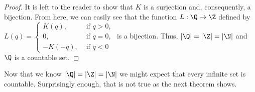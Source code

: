 \begin{proof}
\begin{comment}
Now we need to show $K$ is a surjection. Let $c \in \Z^+$. If $c=1$, then $K\left( \frac{1}{1} \right) = c$. If $c > 1$, then $c$ has prime power factorization $r_1^{2\gamma_1} r_2^{2\gamma_2} \cdots r_l^{2\gamma_l}$ for distinct primes $r_1, r_2, \ldots r_l$, and positive integers $\gamma_1, \gamma_2, \ldots, \gamma_l$. Rearrange the primes $r_i$ so that $\gamma_1, \gamma_2, \ldots, \gamma_k$ are even and $\gamma_{k+1}, \gamma_{k+2}, \ldots, \gamma_{l}$ are odd. Define $p_1, p_2, \ldots, p_k$, $q_1, q_2, \ldots, q_m$, $\alpha_1, \alpha_2, \ldots, \alpha_k$, and $\beta_1, \beta_2, \ldots, \beta_m$ by 
\begin{itemize}
\item $p_1=r_1, p_2=r_2, \ldots, p_k=r_k$, 
\item $q_1 = r_{k+1}, q_2=r_{k+2}, \ldots, q_m=r_{l}$, 
\item $2\alpha_1 = \gamma_1, 2\alpha_2 = \gamma_2, \ldots, 2\alpha_k = \gamma_k$, and 
\item $2\beta_1-1 = \gamma_{k+1}, 2\beta_2-1 = \gamma_{k+2}, \ldots, 2\beta_m-1 = \gamma_{l}$. 
\end{itemize}
Then, if $a = p_1^{\alpha_1} p_2^{\alpha_2} \cdots p_k^{\alpha_k}$ and $b= q_1^{\beta_1} q_2^{\beta_2} \cdots q_m^{\beta_m}$, we have   
\[c = p_1^{2\alpha_1} p_2^{2\alpha_2} \cdots p_k^{2\alpha_k} q_1^{2\beta_1-1} q_2^{2\beta_2-1} \cdots q_m^{2\beta_m-1} = \frac{a}{b}.\]
Thus, $K$ is a surjection. Since $K$ is both an injection and surjection, we see that $K$ is a bijection.
\end{comment}

It is left to the reader to show that $K$ is a surjection and, consequently, a bijection. From here, we can easily see that the function $L : \Q \to \Z$ defined by $L(q) = 
\begin{cases}
K(q), &\text{ if $q>0$}, \\
0, 	&\text{ if $q=0$}, \\
-K(-q), &\text{ if $q<0$}
\end{cases}$
is a bijection. Thus, $|\Q| = |\Z| = |\N|$ and $\Q$ is a countable set. 
\end{proof}

 \label{sec_card_set_real}

Now that we know $|\Q| = |\Z| = |\N|$ we might expect that every infinite set is countable. Surprisingly enough, that is not true as the next theorem shows. 

